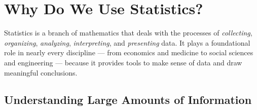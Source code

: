 







\section{Why Do We Use Statistics?}

Statistics is a branch of mathematics that deals with the processes of \textit{collecting}, \textit{organizing}, \textit{analyzing}, \textit{interpreting}, and \textit{presenting} data. It plays a foundational role in nearly every discipline --- from economics and medicine to social sciences and engineering --- because it provides tools to make sense of data and draw meaningful conclusions.

\subsection{Understanding Large Amounts of Information}

